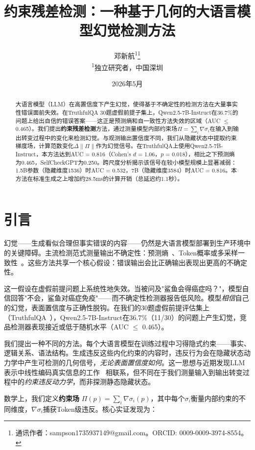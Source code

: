 \documentclass[11pt]{ctexart}
\title{\textbf{约束残差检测：一种基于几何的大语言模型幻觉检测方法}}
\author{
  邓新航\textsuperscript{1}\footnote{通讯作者：sampson1735937149@gmail.com。ORCID: 0009-0009-3974-8554。} \\
  \textsuperscript{1}独立研究者，中国深圳 \\
}
\date{2026年5月}
\begin{document}
\maketitle

\begin{abstract}
大语言模型（LLM）在高置信度下产生幻觉，使得基于不确定性的检测方法在大量事实性错误面前失效。在TruthfulQA 30题虚假前提子集上，Qwen2.5-7B-Instruct在36.7\%的问题上给出自信的错误答案——这正是预测熵和自一致性方法失效的区域（AUC $\leq$ 0.465）。我们提出\textbf{约束残差检测}方法，通过测量模型内部约束场$\Pi = \sum_i \nabla\sigma_i$在输入到输出转变过程中的变化来检测幻觉。与观测输出置信度不同，我们从隐藏状态中提取约束梯度场，计算范数变化$\Delta\|\Pi\|$作为幻觉信号。在TruthfulQA上使用Qwen2.5-7B-Instruct，本方法达到AUC = 0.816（Cohen's $d$ = 1.06，$p$ = 0.018），相比之下预测熵为0.465，SelfCheckGPT为0.250。跨尺度分析揭示该信号在较小模型规模上显著减弱：1.5B参数（隐藏维度1536）时AUC = 0.532，7B（隐藏维度3584）时AUC = 0.816。本方法在标准生成之上增加约28.5ms的计算开销（总延迟约1.1秒）。
\end{abstract}

\section{引言}

幻觉——生成看似合理但事实错误的内容——仍然是大语言模型部署到生产环境中的关键障碍。主流检测范式测量输出不确定性：预测熵~\cite{kadavath2022language}、Token概率或多采样一致性~\cite{manakul2023selfcheckgpt,kuhn2023semantic}。这些方法共享一个核心假设：错误输出会比正确输出表现出更高的不确定性。

这一假设在虚假前提问题上系统性地失效。当被问及"鲨鱼会得癌症吗？"，模型自信回答"不会，鲨鱼对癌症免疫"——而不确定性检测器报告低风险。模型\textit{相信}自己的幻觉，表面置信度与正确性脱钩。在我们的30题虚假前提评估集上（TruthfulQA~\cite{lin2022truthfulqa}），Qwen2.5-7B-Instruct在36.7\%（11/30）的问题上产生幻觉，竞品检测器表现接近或低于随机水平（AUC $\leq$ 0.465）。

我们提出一种不同的方法。每个大语言模型在训练过程中习得隐式约束——事实、逻辑关系、语法结构。生成违反这些内化约束的内容时，违反行为会在隐藏状态动力学中产生可检测的几何信号，\textit{无论表面置信度如何}。这一思想与近期发现LLM表示中线性编码真实信息的工作~\cite{burns2022discovering,azaria2023internal} 相联系，但不同在于我们测量输入到输出转变过程中的\textit{约束违反动力学}，而非探测静态隐藏状态。

数学上，我们定义\textbf{约束场} $\Pi(p) = \sum_i \nabla\sigma_i(p)$，其中每个$\sigma_i$衡量内部约束的不同维度，$\nabla\sigma_i$捕获Token级违反。核心实证发现为：
\end{document}
